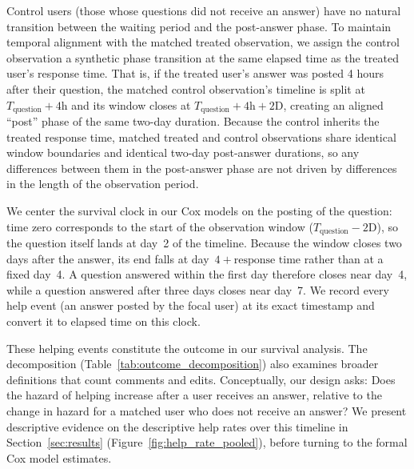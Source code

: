 Control users (those whose questions did not receive an answer) have no natural transition between the waiting period and the post-answer phase. To maintain temporal alignment with the matched treated observation, we assign the control observation a synthetic phase transition at the same elapsed time as the treated user's response time. That is, if the treated user's answer was posted 4 hours after their question, the matched control observation's timeline is split at $T_{\text{question}} + 4\text{h}$ and its window closes at $T_{\text{question}} + 4\text{h} + 2\text{D}$, creating an aligned ``post'' phase of the same two-day duration. Because the control inherits the treated response time, matched treated and control observations share identical window boundaries and identical two-day post-answer durations, so any differences between them in the post-answer phase are not driven by differences in the length of the observation period.

We center the survival clock in our Cox models on the posting of the question: time zero corresponds to the start of the observation window ($T_{\text{question}} - 2\text{D}$), so the question itself lands at day~2 of the timeline. Because the window closes two days after the answer, its end falls at day~$4 + \text{response time}$ rather than at a fixed day~4. A question answered within the first day therefore closes near day~4, while a question answered after three days closes near day~7. We record every help event (an answer posted by the focal user) at its exact timestamp and convert it to elapsed time on this clock.

These helping events constitute the outcome in our survival analysis. The decomposition (Table~\ref{tab:outcome_decomposition}) also examines broader definitions that count comments and edits. Conceptually, our design asks: Does the hazard of helping increase after a user receives an answer, relative to the change in hazard for a matched user who does not receive an answer? We present descriptive evidence on the descriptive help rates over this timeline in Section~\ref{sec:results} (Figure~\ref{fig:help_rate_pooled}), before turning to the formal Cox model estimates.

